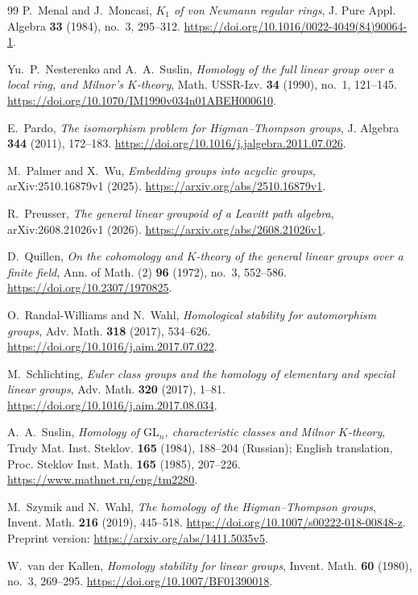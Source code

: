 \documentclass[11pt]{amsart}
\theoremstyle{definition}
\theoremstyle{remark}
\numberwithin{equation}{section}
\begin{document}
\begin{thebibliography}{99}
P.~Menal and J.~Moncasi, \emph{$K_1$ of von Neumann regular rings}, J. Pure Appl. Algebra \textbf{33} (1984), no.~3, 295--312. \url{https://doi.org/10.1016/0022-4049(84)90064-1}.

Yu.~P.~Nesterenko and A.~A.~Suslin, \emph{Homology of the full linear group over a local ring, and Milnor's $K$-theory}, Math. USSR-Izv. \textbf{34} (1990), no.~1, 121--145. \url{https://doi.org/10.1070/IM1990v034n01ABEH000610}.

E.~Pardo, \emph{The isomorphism problem for Higman--Thompson groups}, J. Algebra \textbf{344} (2011), 172--183. \url{https://doi.org/10.1016/j.jalgebra.2011.07.026}.

M.~Palmer and X.~Wu, \emph{Embedding groups into acyclic groups}, arXiv:2510.16879v1 (2025). \url{https://arxiv.org/abs/2510.16879v1}.

R.~Preusser, \emph{The general linear groupoid of a Leavitt path algebra}, arXiv:2608.21026v1 (2026). \url{https://arxiv.org/abs/2608.21026v1}.

D.~Quillen, \emph{On the cohomology and $K$-theory of the general linear groups over a finite field}, Ann. of Math. (2) \textbf{96} (1972), no.~3, 552--586. \url{https://doi.org/10.2307/1970825}.

O.~Randal-Williams and N.~Wahl, \emph{Homological stability for automorphism groups}, Adv. Math. \textbf{318} (2017), 534--626. \url{https://doi.org/10.1016/j.aim.2017.07.022}.

M.~Schlichting, \emph{Euler class groups and the homology of elementary and special linear groups}, Adv. Math. \textbf{320} (2017), 1--81. \url{https://doi.org/10.1016/j.aim.2017.08.034}.

A.~A.~Suslin, \emph{Homology of $\mathrm{GL}_n$, characteristic classes and Milnor $K$-theory}, Trudy Mat. Inst. Steklov. \textbf{165} (1984), 188--204 (Russian); English translation, Proc. Steklov Inst. Math. \textbf{165} (1985), 207--226. \url{https://www.mathnet.ru/eng/tm2280}.

M.~Szymik and N.~Wahl, \emph{The homology of the Higman--Thompson groups}, Invent. Math. \textbf{216} (2019), 445--518. \url{https://doi.org/10.1007/s00222-018-00848-z}. Preprint version: \url{https://arxiv.org/abs/1411.5035v5}.

W.~van der Kallen, \emph{Homology stability for linear groups}, Invent. Math. \textbf{60} (1980), no.~3, 269--295. \url{https://doi.org/10.1007/BF01390018}.


\end{thebibliography}
\end{document}
